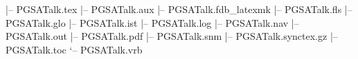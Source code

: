 |-- PGSATalk.tex
|-- PGSATalk.aux
|-- PGSATalk.fdb_latexmk
|-- PGSATalk.fls
|-- PGSATalk.glo
|-- PGSATalk.ist
|-- PGSATalk.log
|-- PGSATalk.nav
|-- PGSATalk.out
|-- PGSATalk.pdf
|-- PGSATalk.snm
|-- PGSATalk.synctex.gz
|-- PGSATalk.toc
`-- PGSATalk.vrb

